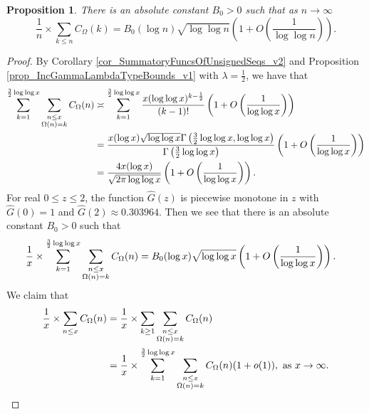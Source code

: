 \documentclass[11pt,reqno,a4letter]{article}
\numberwithin{figure}{section}
\numberwithin{table}{section}
\theoremstyle{plain}
\newtheorem{prop}[theorem]{Proposition}
\numberwithin{theorem}{section}
\theoremstyle{definition}
\begin{document}
\begin{prop} 
\label{lemma_HatCAstxSum_ExactFormulaWithError_v1} 
There is an absolute constant $B_0 > 0$ such that 
as $n \rightarrow \infty$ 
\[
\frac{1}{n} \times \sum_{k \leq n} C_{\Omega}(k) = 
B_0 (\log n) \sqrt{\log\log n}\left(1 + O\left(\frac{1}{\log\log n}\right)\right). 
\] 
\end{prop} 
\begin{proof} 
By Corollary \ref{cor_SummatoryFuncsOfUnsignedSeqs_v2} and 
Proposition \ref{prop_IncGammaLambdaTypeBounds_v1} 
with $\lambda = \frac{1}{2}$, we have that 
\begin{align} 
\notag 
\sum_{k=1}^{\frac{3}{2} \log\log x} \sum_{\substack{n \leq x \\ \Omega(n) = k}} C_{\Omega}(n) & \asymp 
     \sum_{k=1}^{\frac{3}{2} \log\log x} \frac{x (\log\log x)^{k-\frac{1}{2}}}{(k-1)!} 
     \left(1 + O\left(\frac{1}{\log\log x}\right)\right) \\ 
\notag 
     & = \frac{x (\log x) \sqrt{\log\log x} \Gamma\left(\frac{3}{2} \log\log x, \log\log x\right)}{ 
     \Gamma\left(\frac{3}{2} \log\log x\right)} 
     \left(1 + O\left(\frac{1}{\log\log x}\right)\right) \\ 
\notag 
     & = 
     \frac{4x (\log x)}{\sqrt{2\pi \log\log x}} \left(1 + O\left(\frac{1}{\log\log x}\right)\right). 
\end{align}
For real $0 \leq z \leq 2$, the function $\widehat{G}(z)$ is piecewise monotone in 
$z$ with $\widehat{G}(0) = 1$ and $\widehat{G}(2) \approx 0.303964$. 
Then we see that there is an absolute constant $B_0 > 0$ such that 
\begin{align} 
\notag 
\frac{1}{x} \times \sum_{k=1}^{\frac{3}{2} \log\log x} 
     \sum_{\substack{n \leq x \\ \Omega(n) = k}} C_{\Omega}(n) & = 
     B_0 (\log x) \sqrt{\log\log x} \left(1 + O\left(\frac{1}{\log\log x}\right)\right). 
\end{align} 
We claim that 
\begin{align} 
\notag 
\frac{1}{x} \times \sum_{n \leq x} C_{\Omega}(n) & = \frac{1}{x} \times 
     \sum_{k \geq 1} \sum_{\substack{n \leq x \\ \Omega(n) = k}} C_{\Omega}(n) \\ 
\notag 
     & = 
     \frac{1}{x} \times \sum_{k=1}^{\frac{3}{2} \log\log x} 
     \sum_{\substack{n \leq x \\ \Omega(n) = k}} 
     C_{\Omega}(n) (1+o(1)), 
     \text{ as } x \rightarrow \infty. 
\end{align} 

\end{proof}
\end{document}
